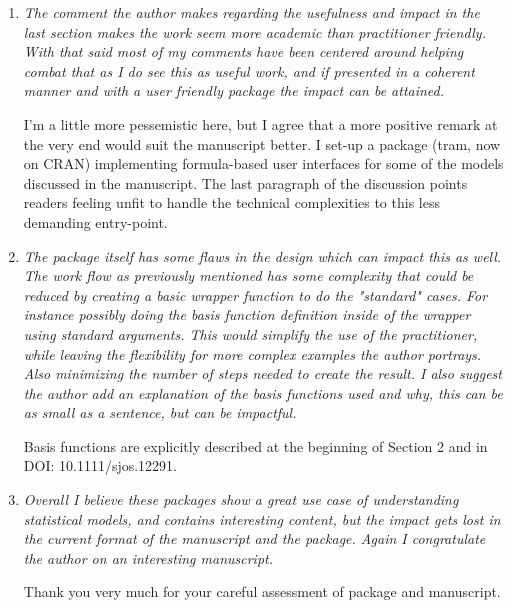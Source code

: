 \documentclass[12pt]{article}
\begin{document}
\begin{enumerate}
\item \textit{The comment the author makes regarding the usefulness and
impact in the last section makes the work seem more academic than
practitioner friendly.  With that said most of my comments have been
centered around helping combat that as I do see this as useful work, and if
presented in a coherent manner and with a user friendly package the impact
can be attained. }

I'm a little more pessemistic here, but I agree that a more positive remark
at the very end would suit the manuscript better. I set-up a package (tram,
now on CRAN) implementing formula-based user interfaces for some of the
models discussed in the manuscript. The last paragraph of the discussion
points readers feeling unfit to handle the technical complexities to this
less demanding entry-point.

\item \textit{The package itself has some flaws in the design which can
impact this as well.  The work flow as previously mentioned has some
complexity that could be reduced by creating a basic wrapper function to do
the "standard" cases.  For instance possibly doing the basis function
definition inside of the wrapper using standard arguments.  This would
simplify the use of the practitioner, while leaving the flexibility for more
complex examples the author portrays.  Also minimizing the number of steps
needed to create the result.  I also suggest the author add an explanation
of the basis functions used and why, this can be as small as a sentence, but
can be impactful.  }

Basis functions are explicitly described at the beginning of Section 2 and
in DOI: 10.1111/sjos.12291.

\item \textit{Overall I believe these packages show a great use case of
understanding statistical models, and contains interesting content, but the
impact gets lost in the current format of the manuscript and the package. 
Again I congratulate the author on an interesting manuscript.}

Thank you very much for your careful assessment of package and manuscript.

\end{enumerate}
\end{document}
